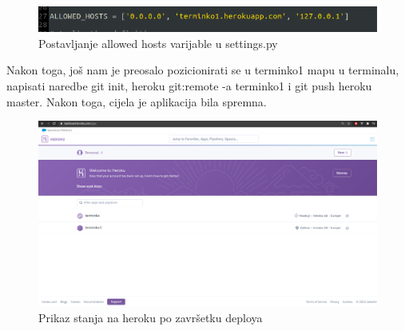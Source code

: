 			\begin{figure}[H]
				\centering
				\includegraphics[scale=0.60]{slike/AllowedHosts.PNG}
				\caption{Postavljanje allowed hosts varijable u settings.py}
				\label{fig:promjene}
			\end{figure}
		
			Nakon toga, još nam je preosalo pozicionirati se u terminko1 mapu u terminalu, napisati naredbe git init, heroku git:remote -a terminko1 i git push heroku master. Nakon toga, cijela je aplikacija bila spremna. 
			
			\begin{figure}[H]
				\centering
				\includegraphics[scale=0.20]{slike/HerokuAplikacije.PNG}
				\caption{Prikaz stanja na heroku po završetku deploya}
				\label{fig:promjene}
			\end{figure}